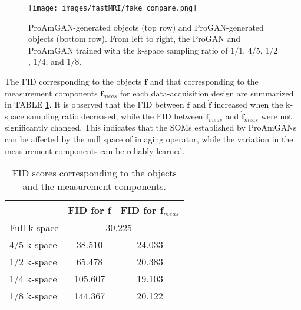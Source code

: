 \documentclass[journal]{IEEEtran}
\renewcommand{\vec}[1]{\mathbf{#1}}
\begin{document}
 \vspace{-0.25cm}
\begin{figure}[H]
   \centering
 \texttt{[image: images/fastMRI/fake\_compare.png]}
 \caption{ProAmGAN-generated objects (top row) and ProGAN-generated objects (bottom row). From left to right, the ProGAN and ProAmGAN trained with the k-space sampling ratio of ${1}/{1}$, ${4}/{5}$, ${1}/{2}$, ${1}/{4}$, and ${1}/{8}$.}
 \label{fig:samplings}
 \vspace{-0.35cm}
\end{figure}

The FID corresponding to the objects $\vec{f}$ and that corresponding to the measurement components $\vec{f}_{meas}$ for each data-acquisition design are summarized in TABLE \ref{table:fids}.
It is observed that the FID between $\vec{f}$ and $\hat{\vec{f}}$  increased when the k-space sampling ratio decreased, while the FID between $\vec{f}_{meas}$ and $\hat{\vec{f}}_{meas}$ were not significantly changed. 
This indicates that the SOMs established by ProAmGANs can be affected by the null space of imaging operator, while the variation in the measurement components can be reliably learned.  



\begin{table}[H]
\center
\begin{tabular}{l|c|c}
\hline\hline
             & FID for $\vec{f}$ & FID for $\vec{f}_{meas}$ \\ \hline
Full k-space & \multicolumn{2}{l}{\ \ \ \ \ \ \ \ 30.225} \\ \hline
4/5 k-space  & 38.510                         & 24.033                               \\ \hline
1/2 k-space  & 65.478                         & 20.383                               \\ \hline
1/4 k-space  & 105.607                        & 19.103                               \\ \hline
1/8 k-space  & 144.367                        & 20.122                               \\ \hline
\end{tabular}
\caption{FID scores corresponding to the objects and the measurement components. }
\label{table:fids}
\end{table}
\end{document}
